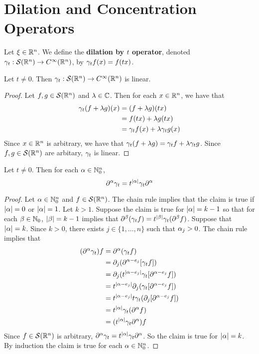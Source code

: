 \documentclass{book}
\begin{document}
	
	
	
	
	
	
	
	\newpage
	\section{Dilation and Concentration Operators}

	\begin{defn}
		Let $\xi \in \mathbb{R}^n$. We define the \textbf{dilation by $t$ operator}, denoted $\gamma_t: \mathcal{S}(\mathbb{R}^n) \rightarrow C^{\infty}(\mathbb{R}^n)$, by $\gamma_t f(x) = f(tx)$.
	\end{defn}
	
	\begin{ex}
		Let $t \neq 0$. Then $\gamma_t: \mathcal{S}(\mathbb{R}^n) \rightarrow C^{\infty}(\mathbb{R}^n)$ is linear.
	\end{ex}
	
	\begin{proof}
		Let $f, g \in \mathcal{S}(\mathbb{R}^n)$ and $\lambda \in \mathbb{C}$. Then for each $x \in \mathbb{R}^n$, we have that
		\begin{align*}
			\gamma_t(f + \lambda g)(x) 
			& =(f+ \lambda g)(tx) \\
			& = f(tx) + \lambda g(tx) \\
			& = \gamma_tf (x) + \lambda \gamma_t g(x)
		\end{align*}
		Since $x \in \mathbb{R}^n$ is arbitrary, we have that $\gamma_t (f + \lambda g) = \gamma_t f + \lambda \gamma_t g$. Since $f, g \in \mathcal{S}(\mathbb{R}^n)$ are arbitary, $\gamma_t$ is linear. 
	\end{proof}
	
	\begin{ex}
		Let $t \neq 0$. Then for each $\alpha \in \mathbb{N}_0^n$,  
		$$\partial^{\alpha} \gamma_t = t^{|\alpha|} \gamma_t \partial^{\alpha} $$
	\end{ex}
	
	\begin{proof}
		Let $\alpha \in \mathbb{N}_0^n$ and $f \in \mathcal{S}(\mathbb{R}^n)$. The chain rule implies that the claim is true if $|\alpha| = 0$ or $|\alpha| = 1$. Let $k > 1$. Suppose the claim is true for $|\alpha| = k-1$ so that for each $\beta \in \mathbb{N}_0$, $|\beta| = k-1$ implies that $\partial^{\beta} (\gamma_t f) = t^{|\beta|} \gamma_t( \partial^{\beta} f)$. Suppose that $|\alpha| = k$. Since $k > 0$, there exists $j \in \{1, \ldots, n\}$ such that $\alpha_j > 0$. The chain rule implies that
		\begin{align*}
			(\partial^{\alpha} \gamma_t) f
			& = \partial^{\alpha} (\gamma_t f) \\
			& = \partial_j (\partial^{\alpha - e_j} [\gamma_t f]) \\
			& = \partial_j (t^{|\alpha - e_j|} \gamma_t [\partial^{\alpha - e_j} f]) \\
			& = t^{|\alpha - e_j|} \partial_j (\gamma_t [\partial^{\alpha - e_j} f]) \\
			& = t^{|\alpha - e_j|} t \gamma_t (\partial_j [\partial^{\alpha - e_j} f]) \\
			& = t^{|\alpha|} \gamma_t (\partial^{\alpha} f) \\
			& = (t^{|\alpha|} \gamma_t \partial^{\alpha}) f
		\end{align*} 
		Since $f \in \mathcal{S}(\mathbb{R}^n)$ is arbitrary, $\partial^{\alpha} \gamma_t = t^{|\alpha|} \gamma_t \partial^{\alpha}$. So the claim is true for $|\alpha| = k$. By induction the claim is true for each $\alpha \in \mathbb{N}_0^n$. 
	\end{proof}
\end{document}
